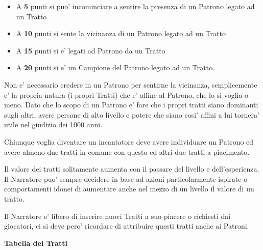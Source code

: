 \documentclass[a4paper,11pt,twoside,openany]{book}
\begin{document}
\begin{itemize}
	\item A \textbf{5} punti si puo' incominciare a sentire la presenza di un Patrono
legato ad un Tratto
	\item A \textbf{10} punti si sente la vicinanza di un Patrono legato ad un Tratto
	\item A \textbf{15} punti si e' legati ad Patrono da un Tratto
	\item A \textbf{20} punti si e' un Campione del Patrono legato ad un Tratto.
\end{itemize}

Non e' necessario credere in un Patrono per sentirne la vicinanza, semplicemente e' la propria natura (i propri Tratti) che e' affine al Patrono, che lo si voglia o meno.
Dato che lo scopo di un Patrono e' fare che i propri tratti siano dominanti sugli altri, avere persone di alto livello e potere che siano cosi' affini a lui tornera' utile nel giudizio dei   1000 anni.

Chiunque voglia diventare un incantatore deve avere individuare un Patrono ed avere almeno due tratti in comune con questo ed altri due tratti a piacimento.

\smallskip

Il valore dei tratti solitamente aumenta con il passare del livello e dell'esperienza. Il Narratore puo' sempre decidere in base ad azioni particolarmente ispirate o comportamenti idonei di aumentare anche nel mezzo di un livello il valore di un tratto.

Il Narratore e' libero di inserire nuovi Tratti a suo piacere o richiesti dai giocatori, ci si deve pero' ricordare di attribuire questi tratti anche ai Patroni.

\bigskip

\textbf{Tabella dei Tratti}

\medskip
\end{document}
